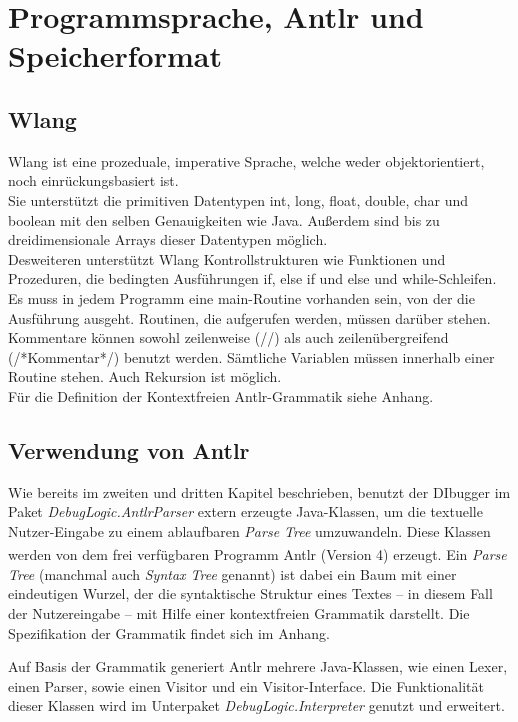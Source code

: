 \documentclass[parskip=full]{scrartcl}
\begin{document}
\section{Programmsprache, Antlr und Speicherformat}\label{FormSpez}

\subsection{Wlang}

Wlang ist eine prozeduale, imperative Sprache, welche weder objektorientiert, noch einrückungsbasiert ist. \\
Sie unterstützt die primitiven Datentypen int, long, float, double, char und boolean mit den selben Genauigkeiten wie Java.
Außerdem sind  bis zu dreidimensionale Arrays dieser Datentypen möglich. \\
Desweiteren unterstützt Wlang Kontrollstrukturen wie Funktionen und Prozeduren, die bedingten Ausführungen if, else if und else und while-Schleifen. \\
Es muss in jedem Programm eine main-Routine vorhanden sein, von der die Ausführung ausgeht. Routinen, die aufgerufen werden, müssen darüber stehen. Kommentare können
sowohl zeilenweise (//) als auch zeilenübergreifend (/*Kommentar*/) benutzt werden.
Sämtliche Variablen müssen innerhalb einer Routine stehen. Auch Rekursion ist möglich. \\
Für die Definition der Kontextfreien Antlr-Grammatik siehe Anhang.


\subsection{Verwendung von Antlr}

Wie bereits im zweiten und dritten Kapitel beschrieben, benutzt der DIbugger im Paket \textit{DebugLogic.AntlrParser} extern erzeugte Java-Klassen, um die textuelle Nutzer-Eingabe zu einem ablaufbaren \textit{Parse Tree} umzuwandeln. Diese Klassen werden von dem frei verfügbaren Programm Antlr\textsuperscript{\textcopyright} (Version 4) erzeugt.
Ein \textit{Parse Tree} (manchmal auch \textit{Syntax Tree} genannt) ist dabei ein Baum mit einer eindeutigen Wurzel, der die syntaktische Struktur eines Textes – in diesem Fall der Nutzereingabe – mit Hilfe einer kontextfreien Grammatik darstellt. Die Spezifikation der Grammatik findet sich im Anhang.

Auf Basis der Grammatik generiert Antlr mehrere Java-Klassen, wie einen Lexer, einen Parser, sowie einen Visitor und ein Visitor-Interface. Die Funktionalität dieser Klassen wird im Unterpaket \textit{DebugLogic.Interpreter} genutzt und erweitert.
\end{document}
